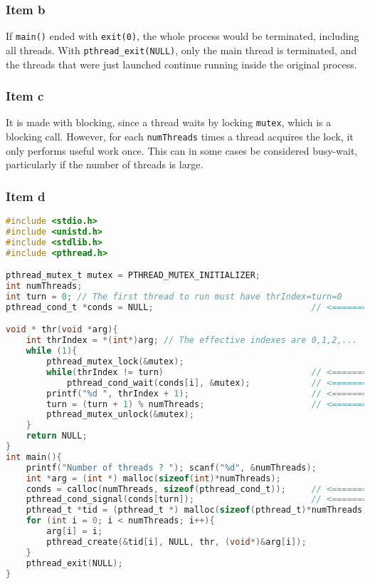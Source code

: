 {\subsubsection{Item b}
If \texttt{main()} ended with \texttt{exit(0)}, the whole process would be terminated, including all threads. With \texttt{pthread\_exit(NULL)}, only the main thread is terminated, and the threads that were just launched continue running inside the original process.

\subsubsection{Item c}
It is made with blocking, since a thread waits by locking \texttt{mutex}, which is a blocking call. However, for each \texttt{numThreads} times a thread acquires the lock, it only performs useful work once. This can in some cases be considered busy-wait, particularly if the number of threads is large.

\subsubsection{Item d}
\begin{lstlisting}[language=C]
#include <stdio.h>
#include <unistd.h>
#include <stdlib.h>
#include <pthread.h>

pthread_mutex_t mutex = PTHREAD_MUTEX_INITIALIZER;
int numThreads;
int turn = 0; // The first thread to run must have thrIndex=turn=0
pthread_cond_t *conds = NULL;                               // <========

void * thr(void *arg){
    int thrIndex = *(int*)arg; // The effective indexes are 0,1,2,...
    while (1){
        pthread_mutex_lock(&mutex);
        while(thrIndex != turn)                             // <========
            pthread_cond_wait(conds[i], &mutex);            // <========
        printf("%d ", thrIndex + 1);                        // <========
        turn = (turn + 1) % numThreads;                     // <========
        pthread_mutex_unlock(&mutex);
    }
    return NULL;
}
int main(){
    printf("Number of threads ? "); scanf("%d", &numThreads);
    int *arg = (int *) malloc(sizeof(int)*numThreads);
    conds = calloc(numThreads, sizeof(pthread_cond_t));     // <========
    pthread_cond_signal(conds[turn]);                       // <========
    pthread_t *tid = (pthread_t *) malloc(sizeof(pthread_t)*numThreads);
    for (int i = 0; i < numThreads; i++){
        arg[i] = i;
        pthread_create(&tid[i], NULL, thr, (void*)&arg[i]);
    }
    pthread_exit(NULL);
}
\end{lstlisting}

}
